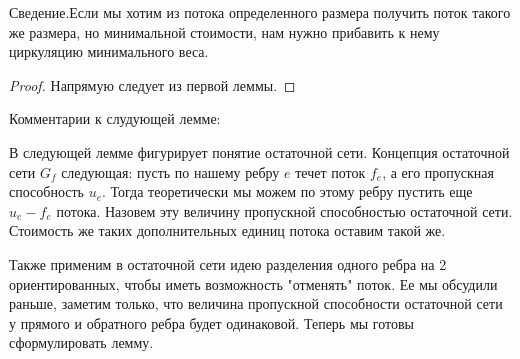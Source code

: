 \begin{lemma}
	Сведение.Если мы хотим из потока определенного размера получить поток такого же размера, но минимальной стоимости, нам нужно прибавить к нему циркуляцию минимального веса.
\end{lemma}
\begin{proof}
	Напрямую следует из первой леммы.
\end{proof}

Комментарии к слудующей лемме:
	
В следующей лемме фигурирует понятие остаточной сети. Концепция остаточной сети $G_f$ следующая: пусть по нашему ребру $e$ течет поток $f_e$, а его пропускная способность $u_e$. Тогда теоретически мы можем по этому ребру пустить еще $u_e - f_e$ потока. Назовем эту величину 
пропускной способностью остаточной сети. Стоимость же таких дополнительных единиц потока оставим такой же.

Также применим в остаточной сети идею разделения одного ребра на 2 ориентированных, чтобы иметь возможность "отменять" поток. Ее мы обсудили раньше, заметим только, что величина пропускной способности остаточной 
сети у прямого и обратного ребра будет одинаковой. Теперь мы готовы сформулировать лемму.

